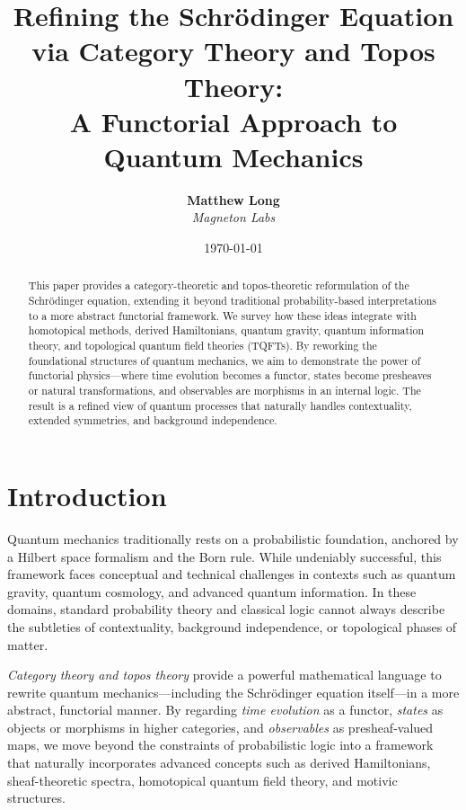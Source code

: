 \documentclass[12pt]{article}
\title{\textbf{Refining the Schr\"odinger Equation via Category Theory and Topos Theory: \\ 
A Functorial Approach to Quantum Mechanics}}
\author{
  \textbf{Matthew Long} \\
  \emph{Magneton Labs}
}
\date{\today}
\begin{document}
\maketitle

\begin{abstract}
This paper provides a category-theoretic and topos-theoretic
reformulation of the Schr\"odinger equation, extending it beyond
traditional probability-based interpretations to a more abstract
functorial framework. We survey how these ideas integrate with
homotopical methods, derived Hamiltonians, quantum gravity, quantum
information theory, and topological quantum field theories (TQFTs).
By reworking the foundational structures of quantum mechanics,
we aim to demonstrate the power of functorial physics---where
time evolution becomes a functor, states become presheaves or
natural transformations, and observables are morphisms in an
internal logic. The result is a refined view of quantum processes
that naturally handles contextuality, extended symmetries, and
background independence. 
\end{abstract}

\tableofcontents

\section{Introduction}
Quantum mechanics traditionally rests on a probabilistic foundation,
anchored by a Hilbert space formalism and the Born rule. While
undeniably successful, this framework faces conceptual and technical
challenges in contexts such as quantum gravity, quantum cosmology,
and advanced quantum information. In these domains, standard
probability theory and classical logic cannot always describe the
subtleties of contextuality, background independence, or topological
phases of matter.

\emph{Category theory and topos theory} provide a powerful
mathematical language to rewrite quantum mechanics---including
the Schr\"odinger equation itself---in a more abstract, functorial
manner. By regarding \emph{time evolution} as a functor, \emph{states}
as objects or morphisms in higher categories, and \emph{observables}
as presheaf-valued maps, we move beyond the constraints of
probabilistic logic into a framework that naturally incorporates
advanced concepts such as derived Hamiltonians, sheaf-theoretic
spectra, homotopical quantum field theory, and motivic structures.
\end{document}
